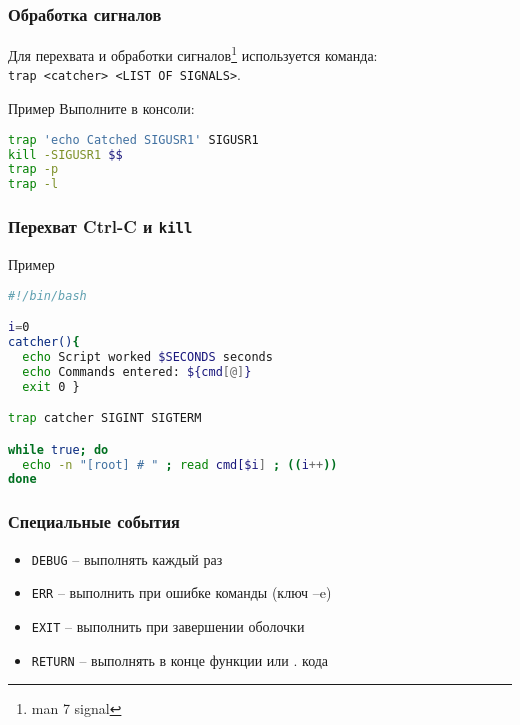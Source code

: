 \begin{frame}[fragile]
	\frametitle{Обработка сигналов}
	
	Для перехвата и обработки сигналов\footnote{man 7 signal} используется команда:\\
	{\tt trap <catcher> <LIST OF SIGNALS>}.

	\begin{block}{Пример}
		Выполните в консоли:
			\begin{lstlisting}[language=sh]
trap 'echo Catched SIGUSR1' SIGUSR1
kill -SIGUSR1 $$
trap -p
trap -l
			\end{lstlisting}
	\end{block}
\end{frame}


\begin{frame}[fragile]
	\frametitle{Перехват Ctrl-C и {\tt kill}}
	
	\begin{block}{Пример}
		\begin{lstlisting}[language=sh]
#!/bin/bash

i=0
catcher(){
  echo Script worked $SECONDS seconds
  echo Commands entered: ${cmd[@]}
  exit 0 }

trap catcher SIGINT SIGTERM

while true; do
  echo -n "[root] # " ; read cmd[$i] ; ((i++))
done
		\end{lstlisting}
	\end{block}
\end{frame}


\begin{frame}[fragile]
	\frametitle{Специальные события}

	\begin{itemize}
		\item {\tt DEBUG} -- выполнять каждый раз 
		\item {\tt ERR} -- выполнить при ошибке команды (ключ --e)
		\item {\tt EXIT} -- выполнить при завершении оболочки 
		\item {\tt RETURN} -- выполнять в конце функции или . кода
	\end{itemize}
\end{frame}
